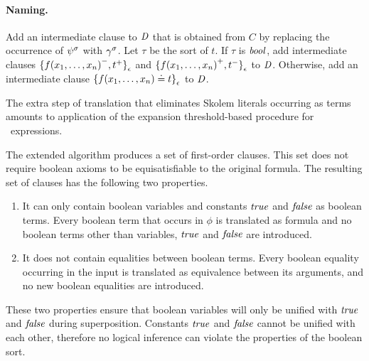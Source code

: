 \begin{itemize}
    \paragraph{Naming.} Add an intermediate clause to $\mathit{D}$ that is obtained from $C$ by replacing the occurrence of ${\psi}^{\sigma}$ with ${\gamma}^{\sigma}$. Let $\tau$ be the sort of $t$. If $\tau$ is $\mathit{bool}$, add intermediate clauses ${\{{f(x_1,\ldots,x_n)}^{-},{t}^{+}\}}_{\epsilon}$ and ${\{{f(x_1,\ldots,x_n)}^{+},{t}^{-}\}}_{\epsilon}$ to $\mathit{D}$. Otherwise, add an intermediate clause ${\{f(x_1,\ldots,x_n) \doteq t\}}_{\epsilon}$ to $\mathit{D}$.
\end{itemize}

The extra step of translation that eliminates Skolem literals occurring as terms amounts to application of the expansion threshold-based procedure for \ITE\ expressions.

The extended \newcnf{} algorithm produces a set of first-order clauses. This set does not require boolean axioms to be equisatisfiable to the original \folb{} formula. The resulting set of clauses has the following two properties.
\begin{enumerate}
  \item It can only contain boolean variables and constants $\mathit{true}$ and $\mathit{false}$ as boolean terms. Every boolean term that occurs in $\phi$ is translated as formula and no boolean terms other than variables, $\mathit{true}$ and $\mathit{false}$ are introduced. 
  \item It does not contain equalities between boolean terms. Every boolean equality occurring in the input is translated as equivalence between its arguments, and no new boolean equalities are introduced.
\end{enumerate}
These two properties ensure that boolean variables will only be unified with $\mathit{true}$ and $\mathit{false}$ during superposition. Constants $\mathit{true}$ and $\mathit{false}$ cannot be unified with each other, therefore no logical inference can violate the properties of the boolean sort. %